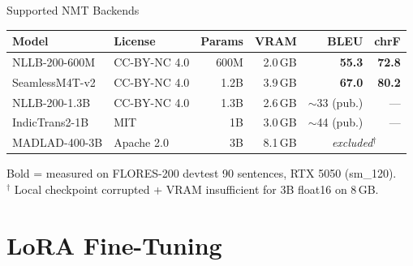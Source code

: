 \documentclass[aspectratio=169,10pt]{beamer}
\begin{document}
\begin{frame}{Supported NMT Backends}
  \begin{table}
  \small
  \centering
  \begin{tabular}{llrrrr}
    \toprule
    Model & License & Params & VRAM & BLEU & chrF \\
    \midrule
    NLLB-200-600M & CC-BY-NC 4.0 & 600M & 2.0\,GB & \textbf{55.3} & \textbf{72.8} \\
    SeamlessM4T-v2 & CC-BY-NC 4.0 & 1.2B & 3.9\,GB & \textbf{67.0} & \textbf{80.2} \\
    NLLB-200-1.3B & CC-BY-NC 4.0 & 1.3B & 2.6\,GB & $\sim$33 (pub.) & --- \\
    IndicTrans2-1B & MIT & 1B & 3.0\,GB & $\sim$44 (pub.) & --- \\
    MADLAD-400-3B & Apache 2.0 & 3B & 8.1\,GB & \multicolumn{2}{c}{\textit{excluded}$^\dagger$} \\
    \bottomrule
  \end{tabular}
  \end{table}
  \footnotesize Bold = measured on FLORES-200 devtest 90 sentences, RTX 5050 (sm\_120).\\
  $^\dagger$ Local checkpoint corrupted + VRAM insufficient for 3B float16 on 8\,GB.
\end{frame}

\section{LoRA Fine-Tuning}
\end{document}
